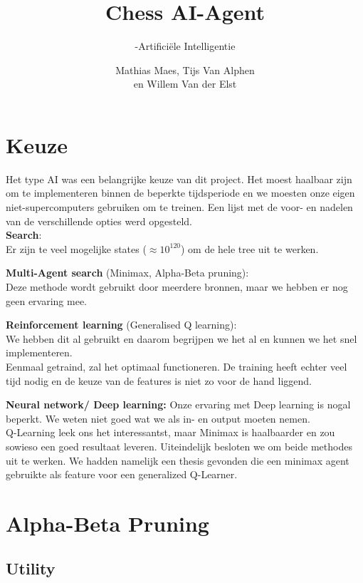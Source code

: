 \documentclass[a4paper,openany]{uantwerpenassignment}
\title{\sffamily Chess AI-Agent}
\subtitle{\sffamily5-Artificiële Intelligentie}
\author{\sffamily Mathias Maes, Tijs Van Alphen \\en Willem Van der Elst}
\begin{document}
\sffamily
\maketitle

\tableofcontents

\chapter{Keuze}
\label{keuze}

Het type AI was een belangrijke keuze van dit project. Het moest haalbaar zijn om te implementeren binnen de beperkte tijdsperiode en we moesten onze eigen niet-supercomputers gebruiken om te treinen. Een lijst  met de voor- en nadelen van de verschillende opties werd opgesteld.\\[2 \baselineskip]


\textbf{Search}:\\
Er zijn te veel mogelijke states ($\approx10^{120}$) om de hele tree uit te werken. 

\textbf{Multi-Agent search} (Minimax, Alpha-Beta pruning):\\
Deze methode wordt gebruikt door meerdere bronnen, maar we hebben er nog geen ervaring mee. 

\textbf{Reinforcement learning} (Generalised Q learning):\\
We hebben dit al gebruikt en daarom begrijpen we het al en kunnen we het snel implementeren.\\
Eenmaal getraind, zal het optimaal functioneren. De training heeft echter veel tijd nodig en de keuze van de features is niet zo voor de hand liggend.

\textbf{Neural network/ Deep learning:}
Onze ervaring met Deep learning is nogal beperkt. We weten niet goed wat we als in- en output moeten nemen. \\[2 \baselineskip]


Q-Learning leek ons het interessantst, maar Minimax is haalbaarder en zou sowieso een goed resultaat leveren. Uiteindelijk besloten we om beide methodes uit te werken. We hadden namelijk een thesis\cite{rl} gevonden die een minimax agent gebruikte als feature voor een generalized Q-Learner.

\chapter{Alpha-Beta Pruning}

\section{Utility}
\label{utility}
\end{document}
